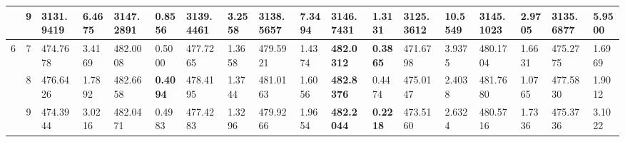 \documentclass[conference]{IEEEtran}
\begin{document}
\begin{table*}[]
\begin{tabular}{|cc|ll|ll|ll|ll|ll|ll|ll|ll|}
		\multicolumn{1}{|c|}{}                            & 9                               & \multicolumn{1}{l|}{3131.9419}         & 6.4675                            & \multicolumn{1}{l|}{\textbf{3147.2891}} & \textbf{0.8556}                   & \multicolumn{1}{l|}{3139.4461}         & 3.2558                            & \multicolumn{1}{l|}{3138.5657}         & 7.3494                            & \multicolumn{1}{l|}{3146.7431}          & 1.3131                            & \multicolumn{1}{l|}{3125.3612}         & 10.5549                           & \multicolumn{1}{l|}{3145.1023}         & 2.9705                            & \multicolumn{1}{l|}{3135.6877}         & 5.9500                            \\ \hline
		\multicolumn{1}{|c|}{\multirow{3}{*}{6}}          & 7                               & \multicolumn{1}{l|}{474.7678}          & 3.4169                            & \multicolumn{1}{l|}{482.0008}           & 0.5000                            & \multicolumn{1}{l|}{477.7265}          & 1.3658                            & \multicolumn{1}{l|}{479.5921}          & 1.4374                            & \multicolumn{1}{l|}{\textbf{482.0312}}  & \textbf{0.3865}                   & \multicolumn{1}{l|}{471.6798}          & 3.9375                            & \multicolumn{1}{l|}{480.1704}          & 1.6631                            & \multicolumn{1}{l|}{475.2775}          & 1.6969                            \\ \cline{2-18} 
		\multicolumn{1}{|c|}{}                            & 8                               & \multicolumn{1}{l|}{476.6426}          & 1.7892                            & \multicolumn{1}{l|}{482.6658}           & \textbf{0.4094}                   & \multicolumn{1}{l|}{478.4195}          & 1.3744                            & \multicolumn{1}{l|}{481.0163}          & 1.6056                            & \multicolumn{1}{l|}{\textbf{482.8376}}  & 0.4474                            & \multicolumn{1}{l|}{475.0147}          & 2.4038                            & \multicolumn{1}{l|}{481.7680}          & 1.0765                            & \multicolumn{1}{l|}{477.5830}          & 1.9012                            \\ \cline{2-18} 
		\multicolumn{1}{|c|}{}                            & 9                               & \multicolumn{1}{l|}{474.3944}          & 3.0216                            & \multicolumn{1}{l|}{482.0471}           & 0.4983                            & \multicolumn{1}{l|}{477.4283}          & 1.3296                            & \multicolumn{1}{l|}{479.9266}          & 1.9654                            & \multicolumn{1}{l|}{\textbf{482.2044}}  & \textbf{0.2218}                   & \multicolumn{1}{l|}{473.5160}          & 2.6324                            & \multicolumn{1}{l|}{480.5716}          & 1.7336                            & \multicolumn{1}{l|}{475.3736}          & 3.1022                            \\ \hline

\end{tabular}
\end{table*}
\end{document}
